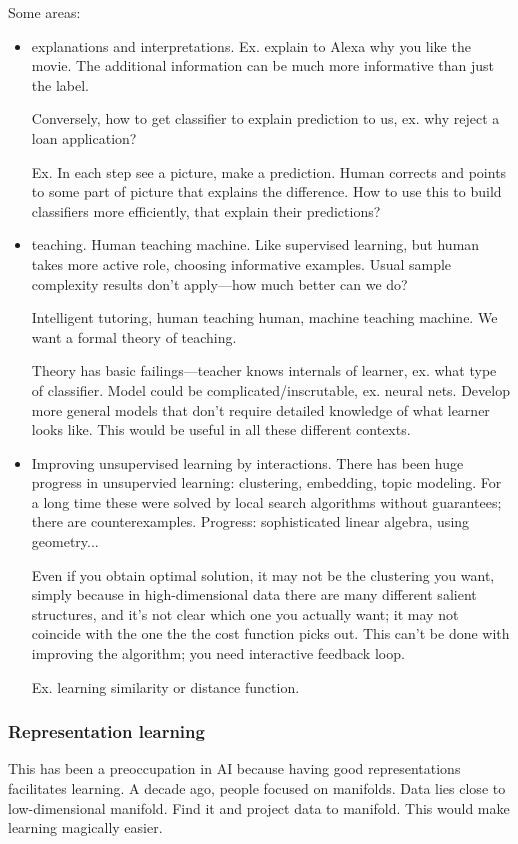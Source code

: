 Some areas:
\begin{itemize}
\item
explanations and interpretations. Ex. explain to Alexa why you like the movie. The additional information can be much more informative than just the label. 

Conversely, how to get classifier to explain prediction to us, ex. why reject a loan application?

Ex. In each step see a picture, make a prediction. Human corrects and points to some part of picture that explains the difference. How to use this to build classifiers more efficiently, that explain their predictions?
\item
teaching. Human teaching machine. Like supervised learning, but human takes more active role, choosing informative examples. Usual sample complexity results don't apply---how much better can we do?

Intelligent tutoring, human teaching human, machine teaching machine. We want a formal theory of teaching.

Theory has basic failings---teacher knows internals of learner, ex. what type of classifier. Model could be complicated/inscrutable, ex. neural nets. Develop more general models that don't require detailed knowledge of what learner looks like. This would be useful in all these different contexts.
\item
Improving unsupervised learning by interactions. There has been huge progress in unsupervied learning: clustering, embedding, topic modeling. For a long time these were solved by local search algorithms without guarantees; there are counterexamples. Progress: sophisticated linear algebra, using geometry...

Even if you obtain optimal solution, it may not be the clustering you want, simply because in high-dimensional data there are many different salient structures, and it's not clear which one you actually want; it may not coincide with the one the the  cost function picks out. This can't be done with improving the algorithm; you need interactive feedback loop. 

Ex. learning similarity or distance function.
\end{itemize}
\subsubsection{Representation learning}

This has been a preoccupation in AI because having good representations facilitates learning. A decade ago, people focused on manifolds. Data lies close to low-dimensional manifold. Find it and project data to manifold. This would make learning magically easier.

